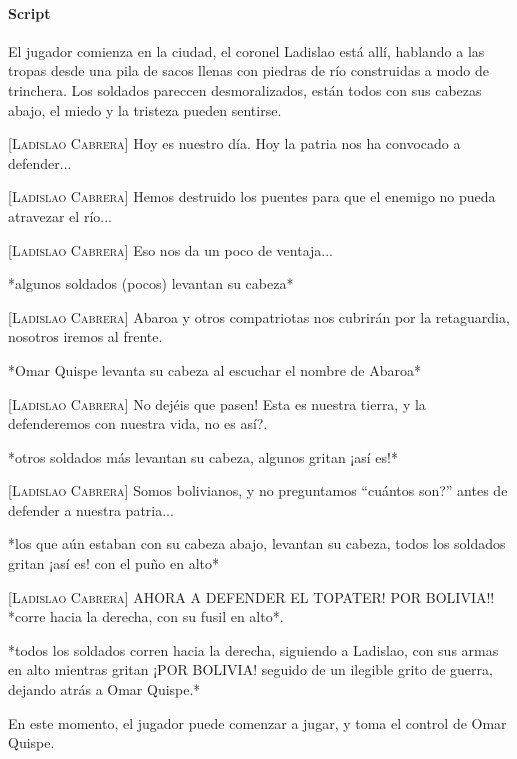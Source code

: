 \paragraph{Script} El jugador comienza en la ciudad, el coronel Ladislao está allí, hablando a las tropas desde una pila de sacos llenas con piedras de río construidas a modo de trinchera. Los soldados pareccen desmoralizados, están todos con sus cabezas abajo, el miedo y la tristeza pueden sentirse.

\textsc{[Ladislao Cabrera]} Hoy es nuestro día. Hoy la patria nos ha convocado a defender...

\textsc{[Ladislao Cabrera]} Hemos destruido los puentes para que el enemigo no pueda atravezar el río...

\textsc{[Ladislao Cabrera]} Eso nos da un poco de ventaja...

*algunos soldados (pocos) levantan  su cabeza*

\textsc{[Ladislao Cabrera]} Abaroa y otros compatriotas nos cubrirán por la retaguardia, nosotros iremos al frente.

*Omar Quispe levanta su cabeza al escuchar el nombre de Abaroa*

\textsc{[Ladislao Cabrera]} No dejéis que pasen! Esta es nuestra tierra, y la defenderemos con nuestra vida, no es así?.

*otros soldados más levantan su cabeza, algunos gritan ¡así es!*  

\textsc{[Ladislao Cabrera]} Somos bolivianos, y no preguntamos ``cuántos son?'' antes de defender a nuestra patria...

*los que aún estaban con su cabeza abajo, levantan su cabeza, todos los soldados gritan ¡así es! con el puño en alto*

\textsc{[Ladislao Cabrera]} AHORA A DEFENDER EL TOPATER! POR BOLIVIA!! *corre hacia la derecha, con su fusil en alto*.

*todos los soldados corren hacia la derecha, siguiendo a Ladislao, con sus armas en alto mientras gritan ¡POR BOLIVIA! seguido de un ilegible grito de guerra, dejando atrás a Omar Quispe.*

En este momento, el jugador puede comenzar a jugar, y toma el control de Omar Quispe.
